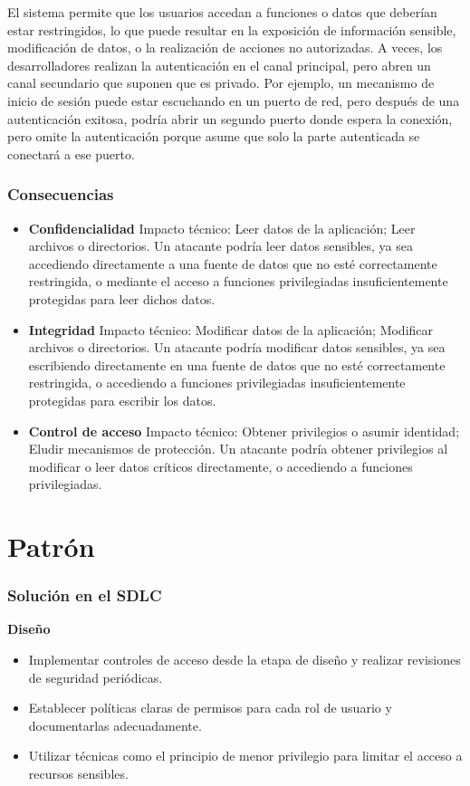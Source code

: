 El sistema permite que los usuarios accedan a funciones o datos que deberían estar restringidos, lo que puede resultar en la exposición de información sensible, modificación de datos, o la realización de acciones no autorizadas. A veces, los desarrolladores realizan la autenticación en el canal principal, pero abren un canal secundario que suponen que es privado. Por ejemplo, un mecanismo de inicio de sesión puede estar escuchando en un puerto de red, pero después de una autenticación exitosa, podría abrir un segundo puerto donde espera la conexión, pero omite la autenticación porque asume que solo la parte autenticada se conectará a ese puerto.

\subsubsection{Consecuencias}
\begin{itemize} 
\item \textbf{Confidencialidad}
Impacto técnico: Leer datos de la aplicación; Leer archivos o directorios.
Un atacante podría leer datos sensibles, ya sea accediendo directamente a una fuente de datos que no esté correctamente restringida, o mediante el acceso a funciones privilegiadas insuficientemente protegidas para leer dichos datos.

\item \textbf{Integridad}
Impacto técnico: Modificar datos de la aplicación; Modificar archivos o directorios.
Un atacante podría modificar datos sensibles, ya sea escribiendo directamente en una fuente de datos que no esté correctamente restringida, o accediendo a funciones privilegiadas insuficientemente protegidas para escribir los datos.

\item \textbf{Control de acceso}
Impacto técnico: Obtener privilegios o asumir identidad; Eludir mecanismos de protección.
Un atacante podría obtener privilegios al modificar o leer datos críticos directamente, o accediendo a funciones privilegiadas.
\end{itemize}

\section{Patrón}

\subsubsection{Solución en el SDLC} \textbf{Diseño} \begin{itemize} \item Implementar controles de acceso desde la etapa de diseño y realizar revisiones de seguridad periódicas. \item Establecer políticas claras de permisos para cada rol de usuario y documentarlas adecuadamente. \item Utilizar técnicas como el principio de menor privilegio para limitar el acceso a recursos sensibles. \end{itemize}

